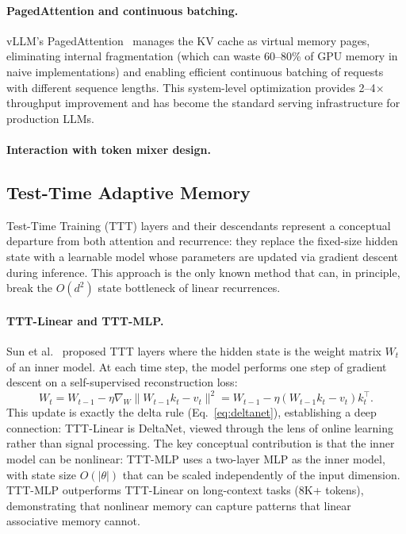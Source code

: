 \paragraph{PagedAttention and continuous batching.}
vLLM's PagedAttention~\cite{kwon2023vllm} manages the KV cache as virtual memory pages, eliminating internal fragmentation (which can waste 60--80\% of GPU memory in naive implementations) and enabling efficient continuous batching of requests with different sequence lengths. This system-level optimization provides 2--4$\times$ throughput improvement and has become the standard serving infrastructure for production LLMs.

\paragraph{Interaction with token mixer design.}

\subsection{Test-Time Adaptive Memory}
\label{subsec:ttm}

Test-Time Training (TTT) layers and their descendants represent a conceptual departure from both attention and recurrence: they replace the fixed-size hidden state with a learnable model whose parameters are updated via gradient descent during inference. This approach is the only known method that can, in principle, break the $O(d^2)$ state bottleneck of linear recurrences.

\paragraph{TTT-Linear and TTT-MLP.}
Sun et al.~\cite{sun2024learning} proposed TTT layers where the hidden state is the weight matrix $W_t$ of an inner model. At each time step, the model performs one step of gradient descent on a self-supervised reconstruction loss:
\begin{equation}
W_t = W_{t-1} - \eta \nabla_W \|W_{t-1} k_t - v_t\|^2 = W_{t-1} - \eta (W_{t-1} k_t - v_t) k_t^\top.
\label{eq:ttt}
\end{equation}
This update is exactly the delta rule (Eq.~\ref{eq:deltanet}), establishing a deep connection: TTT-Linear is DeltaNet, viewed through the lens of online learning rather than signal processing. The key conceptual contribution is that the inner model can be nonlinear: TTT-MLP uses a two-layer MLP as the inner model, with state size $O(|\theta|)$ that can be scaled independently of the input dimension. TTT-MLP outperforms TTT-Linear on long-context tasks (8K+ tokens), demonstrating that nonlinear memory can capture patterns that linear associative memory cannot.

